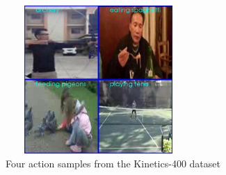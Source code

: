 \documentclass[extern,palatino]{cgMA}
\begin{document}
\begin{figure}[h]
\center
\includegraphics[height={160pt}, width={200pt}]{Thesis/images/kinetics_sample.jpg}
\caption{Four action samples from the Kinetics-400 dataset \cite{kay2017kinetics}}
\label{kinetics_sample}
\end{figure}
\end{document}
